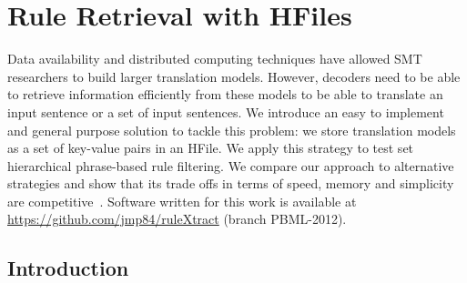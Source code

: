 \chapter{Rule Retrieval with HFiles}
\label{chap:hfile}


Data availability and distributed computing techniques have allowed SMT
researchers to build larger translation models. However, decoders need to be
able to retrieve information efficiently from these models to be able to
translate an input sentence or a set of input sentences. We introduce an easy to
implement and general purpose solution to tackle this problem: we store
translation models as a set of key-value pairs in an HFile. We apply this
strategy to test set hierarchical phrase-based rule filtering. We compare our
approach to alternative strategies and show that its trade offs in terms
of speed, memory and simplicity are
competitive~\citep{pino-waite-byrne:2012:PBML}. Software written for this work
is available at \url{https://github.com/jmp84/ruleXtract} (branch PBML-2012).

\section{Introduction}

